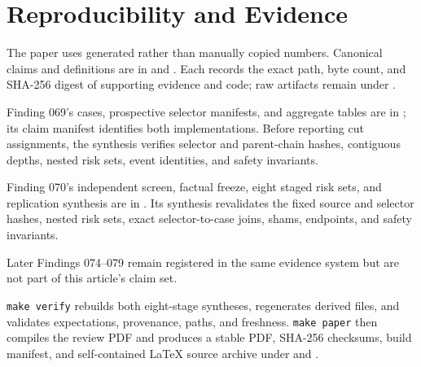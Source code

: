 \section{Reproducibility and Evidence}
\label{sec:reproducibility}

The paper uses generated rather than manually copied numbers. Canonical claims
and definitions are in
 and . Each
 records the exact path, byte count, and
SHA-256 digest of supporting evidence and code; raw artifacts remain under
.

Finding 069's cases, prospective selector manifests, and aggregate tables are
in ; its claim manifest identifies both
implementations. Before reporting cut assignments, the synthesis verifies
selector and parent-chain hashes, contiguous depths, nested risk sets, event
identities, and safety invariants.

Finding 070's independent screen, factual freeze, eight staged risk sets, and
replication synthesis are in . Its synthesis
revalidates the fixed source and selector hashes, nested risk sets, exact
selector-to-case joins, shams, endpoints, and safety invariants.

Later Findings 074--079 remain registered in the same evidence system but are
not part of this article's claim set.

\texttt{make verify} rebuilds both eight-stage syntheses, regenerates derived
files, and validates expectations, provenance, paths, and freshness.
\texttt{make paper} then compiles the review PDF and produces a stable PDF,
SHA-256 checksums, build manifest, and self-contained LaTeX source archive under
 and .
